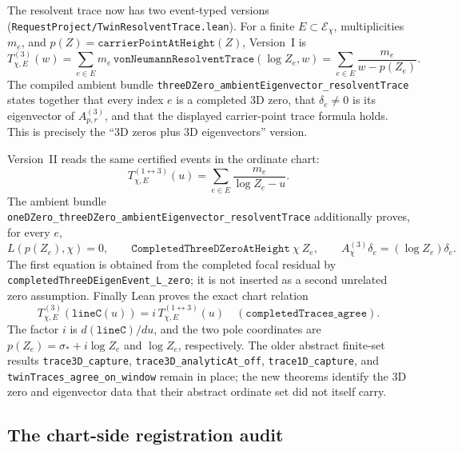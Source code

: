 \documentclass[11pt]{article}
\theoremstyle{definition}
\begin{document}
The resolvent trace now has two event-typed versions
(\texttt{RequestProject/TwinResolventTrace.lean}).  For a finite
\(E\subset\mathcal E_\chi\), multiplicities \(m_e\), and
\(p(Z)=\texttt{carrierPointAtHeight}(Z)\), Version~I is
\[
 T^{(3)}_{\chi,E}(w)
 =\sum_{e\in E}m_e\,
   \texttt{vonNeumannResolventTrace}(\log Z_e,w)
 =\sum_{e\in E}\frac{m_e}{w-p(Z_e)}.
\]
The compiled ambient bundle
\texttt{threeDZero\_ambientEigenvector\_resolventTrace} states together that every
index \(e\) is a completed 3D zero, that \(\delta_e\ne0\) is its eigenvector
of \(A^{(3)}_{p,r}\), and that the displayed carrier-point trace formula
holds.  This is precisely the ``3D zeros plus 3D eigenvectors'' version.

Version~II reads the same certified events in the ordinate chart:
\[
 T^{(1\leftrightarrow3)}_{\chi,E}(u)
 =\sum_{e\in E}\frac{m_e}{\log Z_e-u}.
\]
The ambient bundle
\texttt{oneDZero\_threeDZero\_ambientEigenvector\_resolventTrace} additionally
proves, for every \(e\),
\[
 L\!\left(p(Z_e),\chi\right)=0,
 \qquad
 \texttt{CompletedThreeDZeroAtHeight}\ \chi\ Z_e,
 \qquad
 A^{(3)}_\chi\delta_e=(\log Z_e)\delta_e.
\]
The first equation is obtained from the completed focal residual by
\texttt{completedThreeDEigenEvent\_L\_zero}; it is not inserted as a second
unrelated zero assumption.  Finally Lean proves the exact chart relation
\[
 T^{(3)}_{\chi,E}(\texttt{lineC}(u))
 =i\,T^{(1\leftrightarrow3)}_{\chi,E}(u)
 \quad(\texttt{completedTraces\_agree}).
\]
The factor \(i\) is \(d(\texttt{lineC})/du\), and the two pole coordinates
are \(p(Z_e)=\sigma_*+i\log Z_e\) and \(\log Z_e\), respectively.  The older
abstract finite-set results \texttt{trace3D\_capture},
\texttt{trace3D\_analyticAt\_off}, \texttt{trace1D\_capture}, and
\texttt{twinTraces\_agree\_on\_window} remain in place; the new theorems
identify the 3D zero and eigenvector data that their abstract ordinate set did
not itself carry.

\subsection{The chart-side registration audit}\label{sec:grh-audit}
\end{document}
